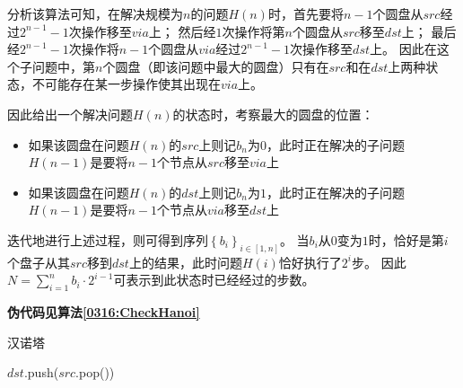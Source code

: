 \begin{questions}
\begin{solution}
\begin{parts}
{            分析该算法可知，在解决规模为$n$的问题$H(n)$时，首先要将$n-1$个圆盘从$src$经过$2^{n-1}-1$次操作移至$via$上；
            然后经$1$次操作将第$n$个圆盘从$src$移至$dst$上；
            最后经$2^{n-1}-1$次操作将$n-1$个圆盘从$via$经过$2^{n-1}-1$次操作移至$dst$上。
            因此在这个子问题中，第$n$个圆盘（即该问题中最大的圆盘）只有在$src$和在$dst$上两种状态，不可能存在某一步操作使其出现在$via$上。

            因此给出一个解决问题$H(n)$的状态时，考察最大的圆盘的位置：
            \begin{itemize}
                \item 如果该圆盘在问题$H(n)$的$src$上则记$b_n$为$0$，此时正在解决的子问题$H(n-1)$是要将$n-1$个节点从$src$移至$via$上
                \item 如果该圆盘在问题$H(n)$的$dst$上则记$b_n$为$1$，此时正在解决的子问题$H(n-1)$是要将$n-1$个节点从$via$移至$dst$上
            \end{itemize}
            迭代地进行上述过程，则可得到序列$\left\{b_i\right\}_{i \in [1, n]}$。
            当$b_i$从$0$变为$1$时，恰好是第$i$个盘子从其$src$移到$dst$上的结果，此时问题$H(i)$恰好执行了$2^i$步。
            因此$N = \sum_{i=1}^n{b_i \cdot 2^{i-1}}$可表示到此状态时已经经过的步数。

            \textbf{伪代码见算法\ref{0316:CheckHanoi}}
            }
        \end{parts}
    \end{solution}

    \begin{algorithm}[!htp]
        \caption{汉诺塔}\label{0319:Hanoi}
        \begin{algorithmic}[1]
            \State{}
            \EndProcedure
            \Statex
            \Statex
            \State $dst$.push($src$.pop()) 
            \Else
            \State {}
            \State {}
            \State {}
            \EndIf
            \EndProcedure
        \end{algorithmic}
    \end{algorithm}


\end{questions}
